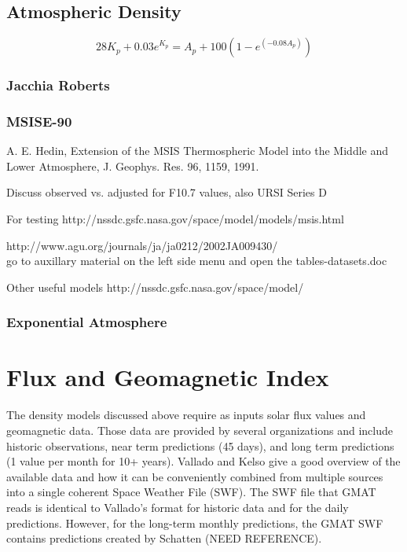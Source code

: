 \subsection{Atmospheric Density}

\begin{equation}
28K_p + 0.03e^{K_p} = A_p + 100\left(1 - e^{(-0.08A_p)}\right)
\end{equation}

\subsubsection{Jacchia Roberts}

\subsubsection{MSISE-90}

A. E. Hedin, Extension of the MSIS Thermospheric Model into the
Middle and Lower Atmosphere, J. Geophys. Res. 96, 1159, 1991.

Discuss observed vs. adjusted for F10.7 values, also URSI Series D

For testing http://nssdc.gsfc.nasa.gov/space/model/models/msis.html

http://www.agu.org/journals/ja/ja0212/2002JA009430/ \\
go to auxillary material on the left side menu and open the
tables-datasets.doc

Other useful models http://nssdc.gsfc.nasa.gov/space/model/

\subsubsection{Exponential Atmosphere}

\section{Flux and Geomagnetic Index}

The density models discussed above require as inputs  solar flux values and geomagnetic data.  Those data are provided by several organizations and include historic observations, near term predictions (45 days), and long term predictions (1 value per month for 10+ years).   Vallado and Kelso\cite{Vallado:Kelso:05} give a good overview of the available data and how it can be conveniently combined from multiple sources into a single coherent Space Weather File (SWF).  The SWF file that GMAT reads is identical to Vallado's format for historic data and for the daily predictions.  However, for the long-term  monthly predictions, the GMAT SWF contains predictions created by Schatten (NEED REFERENCE).

